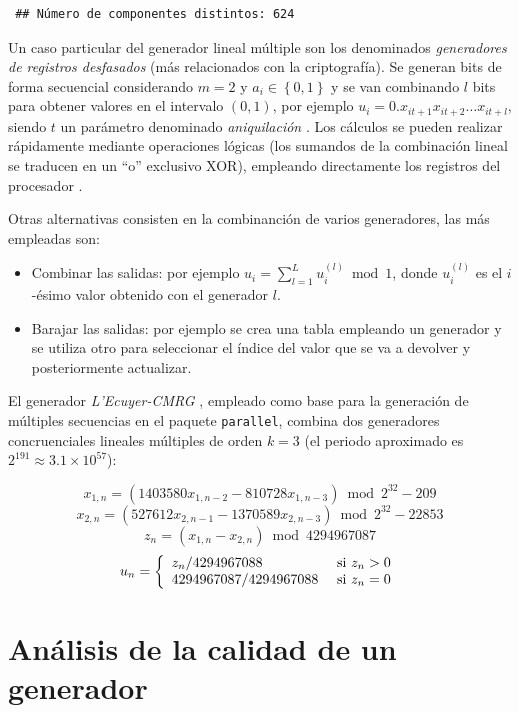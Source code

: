 \documentclass[
  10pt,
]{book}
\theoremstyle{break}
\theoremstyle{nonumberplain}
\begin{document}
\begin{verbatim}
 ## Número de componentes distintos: 624
\end{verbatim}

Un caso particular del generador lineal múltiple son los denominados \emph{generadores de registros desfasados} (más relacionados con la criptografía).
Se generan bits de forma secuencial considerando \(m=2\) y \(a_{i} \in \left \{ 0,1\right \}\) y se van combinando \(l\) bits para obtener valores en el intervalo \((0, 1)\), por ejemplo \(u_i = 0 . x_{it+1} x_{it+2} \ldots x_{it+l}\), siendo \(t\) un parámetro denominado \emph{aniquilación} \citep{tausworthe1965}.
Los cálculos se pueden realizar rápidamente mediante operaciones lógicas (los sumandos de la combinación lineal se traducen en un ``o'' exclusivo XOR), empleando directamente los registros del procesador \citep[ver por ejemplo][Algoritmo 2.1]{ripley1987stochastic}.

Otras alternativas consisten en la combinanción de varios generadores, las más empleadas son:

\begin{itemize}
\item
  Combinar las salidas: por ejemplo \(u_{i}=\sum_{l=1}^L u_{i}^{(l)} \bmod 1\), donde \(u_{i}^{(l)}\) es el \(i\)-ésimo valor obtenido con el generador \(l\).
\item
  Barajar las salidas: por ejemplo se crea una tabla empleando un generador y se utiliza otro para seleccionar el índice del valor que se va a devolver y posteriormente actualizar.
\end{itemize}

El generador \emph{L'Ecuyer-CMRG} \citep{lecuyer99}, empleado como base para la generación de múltiples secuencias en el paquete \texttt{parallel}, combina dos generadores concruenciales lineales múltiples de orden \(k=3\) (el periodo aproximado es \(2^{191} \approx 3.1 \times 10^{57}\)):

\[x_{1,n} = (1403580 x_{1,n−2} − 810728 x_{1,n−3}) \bmod  2^{32} − 209\]
\[x_{2,n} = (527612 x_{2,n−1} − 1370589 x_{2,n−3}) \bmod  2^{32} − 22853\]
\[z_n = (x_{1,n} − x_{2,n}) \bmod  4294967087\]
\[
u_n =
\left\{
\begin{array}[c]{ll}
z_n/4294967088 & \text{ si } z_n > 0\\
4294967087/4294967088 & \text{ si } z_n = 0
\end{array}
\right.
\]

\hypertarget{calgen}{%
\section{Análisis de la calidad de un generador}\label{calgen}}
\end{document}
